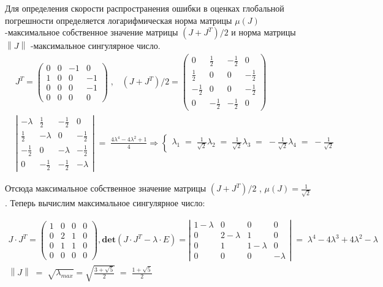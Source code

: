 \documentclass[a4paper,12pt]{article}
\begin{document}
Для определения скорости распространения ошибки в оценках глобальной погрешности определяется логарифмическая норма матрицы $\mu(J)$ -максимальное собственное значение матрицы $(J+J^T)/2$ и норма матрицы $\left\| J\right\|$ -максимальное сингулярное число.
\begin{align*}
    &J^T=
    \left(
    \begin{array}{cccc}
        0&0&-1&0\\
        1&0&0&-1\\
        0&0&0&-1\\
        0&0&0&0
    \end{array}
    \right)\; ,
    \;\;\;
    (J+J^T)/2=
    \left(
    \begin{array}{cccc}
        0&\frac12&-\frac12&0\\
        \frac12&0&0&-\frac12\\
        -\frac12&0&0&-\frac12\\
        0&-\frac12&-\frac12&0
    \end{array}
    \right)
    \\
    &\left|
    \begin{array}{cccc}
    -\lambda&\frac12&-\frac12&0\\
    \frac12&-\lambda&0&-\frac12\\
    -\frac12&0&-\lambda&-\frac12\\
    0&-\frac12&-\frac12&-\lambda
    \end{array}
    \right|
    \;=\;
    \frac{4 \lambda^4 -4 \lambda^2 +1}{4}
    \Rightarrow
    \left\{
    \begin{array}{l}
        \lambda_1\;=\;\frac{1}{\sqrt{2}}
        \lambda_2\;=\;\frac{1}{\sqrt{2}}
        \lambda_3\;=\;-\frac{1}{\sqrt{2}}
        \lambda_4\;=\;-\frac{1}{\sqrt{2}}
    \end{array}
    \right.
\end{align*}

Отсюда максимальное собственное значение матрицы $(J+J^T)/2$ , $\mu(J)=\frac{1}{\sqrt{2}}$ . Теперь вычислим максимальное сингулярное число:

\begin{align*}
    J\cdot J^T=
    \left(
    \begin{array}{cccc}
        1&0&0&0\\
        0&2&1&0\\
        0&1&1&0\\
        0&0&0&0
    \end{array}
    \right),
    \mathbf{det}(J\cdot J^T-\lambda \cdot E)=
    \left|
    \begin{array}{cccc}
        1-\lambda&0&0&0\\
        0&2-\lambda&1&0\\
        0&1&1-\lambda&0\\
        0&0&0&-\lambda
    \end{array}
    \right|
    \;=\;
    \lambda^4-4\lambda^3+4\lambda^2-\lambda
    \\
    \left\| J\right\|\;=\;\sqrt{\lambda_{max}}=\sqrt{\frac{3+\sqrt{5}}{2}}\;=\;\frac{1+\sqrt{5}}{2}
\end{align*}
\end{document}
